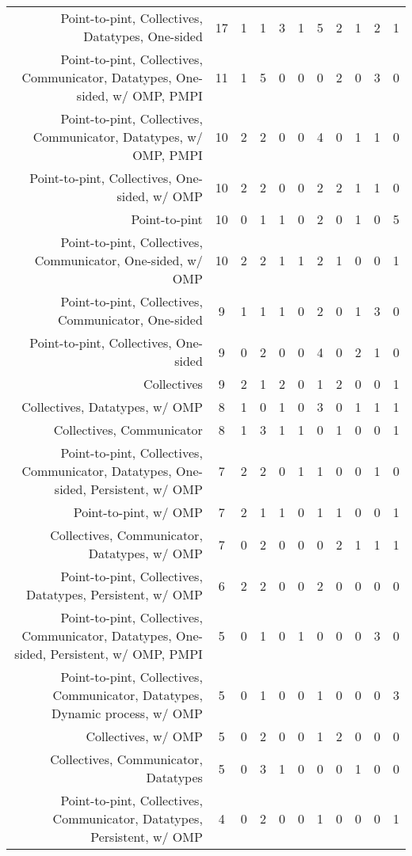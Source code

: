 {\begin{landscape}
\begin{longtable}[htb]{r|c|c|c|c|c|c|c|c|c|c}
{Point-to-pint, Collectives, Datatypes, One-sided} & 17 & 1 & 1 & 3 & 1 & 5 & 2 & 1 & 2 & 1 \\%
{Point-to-pint, Collectives, Communicator, Datatypes, One-sided, w/ OMP, PMPI} & 11 & 1 & 5 & 0 & 0 & 0 & 2 & 0 & 3 & 0 \\%
{Point-to-pint, Collectives, Communicator, Datatypes, w/ OMP, PMPI} & 10 & 2 & 2 & 0 & 0 & 4 & 0 & 1 & 1 & 0 \\%
{Point-to-pint, Collectives, One-sided, w/ OMP} & 10 & 2 & 2 & 0 & 0 & 2 & 2 & 1 & 1 & 0 \\%
{Point-to-pint} & 10 & 0 & 1 & 1 & 0 & 2 & 0 & 1 & 0 & 5 \\%
{Point-to-pint, Collectives, Communicator, One-sided, w/ OMP} & 10 & 2 & 2 & 1 & 1 & 2 & 1 & 0 & 0 & 1 \\%
{Point-to-pint, Collectives, Communicator, One-sided} & 9 & 1 & 1 & 1 & 0 & 2 & 0 & 1 & 3 & 0 \\%
{Point-to-pint, Collectives, One-sided} & 9 & 0 & 2 & 0 & 0 & 4 & 0 & 2 & 1 & 0 \\%
{Collectives} & 9 & 2 & 1 & 2 & 0 & 1 & 2 & 0 & 0 & 1 \\%
{Collectives, Datatypes, w/ OMP} & 8 & 1 & 0 & 1 & 0 & 3 & 0 & 1 & 1 & 1 \\%
{Collectives, Communicator} & 8 & 1 & 3 & 1 & 1 & 0 & 1 & 0 & 0 & 1 \\%
{Point-to-pint, Collectives, Communicator, Datatypes, One-sided, Persistent, w/ OMP} & 7 & 2 & 2 & 0 & 1 & 1 & 0 & 0 & 1 & 0 \\%
{Point-to-pint, w/ OMP} & 7 & 2 & 1 & 1 & 0 & 1 & 1 & 0 & 0 & 1 \\%
{Collectives, Communicator, Datatypes, w/ OMP} & 7 & 0 & 2 & 0 & 0 & 0 & 2 & 1 & 1 & 1 \\%
{Point-to-pint, Collectives, Datatypes, Persistent, w/ OMP} & 6 & 2 & 2 & 0 & 0 & 2 & 0 & 0 & 0 & 0 \\%
{Point-to-pint, Collectives, Communicator, Datatypes, One-sided, Persistent, w/ OMP, PMPI} & 5 & 0 & 1 & 0 & 1 & 0 & 0 & 0 & 3 & 0 \\%
{Point-to-pint, Collectives, Communicator, Datatypes, Dynamic process, w/ OMP} & 5 & 0 & 1 & 0 & 0 & 1 & 0 & 0 & 0 & 3 \\%
{Collectives, w/ OMP} & 5 & 0 & 2 & 0 & 0 & 1 & 2 & 0 & 0 & 0 \\%
{Collectives, Communicator, Datatypes} & 5 & 0 & 3 & 1 & 0 & 0 & 0 & 1 & 0 & 0 \\%
{Point-to-pint, Collectives, Communicator, Datatypes, Persistent, w/ OMP} & 4 & 0 & 2 & 0 & 0 & 1 & 0 & 0 & 0 & 1 \\%

\end{longtable}
\end{landscape}}
